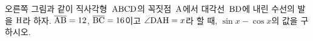 \noindent\begin{minipage}[t]{0.58\linewidth}\vspace{0pt}\raggedright 오른쪽 그림과 같이 직사각형~$\mathrm{ABCD}$의 꼭짓점~$\mathrm{A}$에서 대각선~$\mathrm{BD}$에 내린 수선의 발을 $\mathrm{H}$라 하자. $\overline{\mathrm{AB}}=12$, $\overline{\mathrm{BC}}=16$이고 $\angle\mathrm{DAH}=x$라 할 때, $\sin x-\cos x$의 값을 구하시오.\end{minipage}\hfill\begin{minipage}[t]{0.4\linewidth}\vspace{0pt}\centering \resizebox{\ifdim\width>\linewidth\linewidth\else\width\fi}{!}{}\end{minipage}\par
